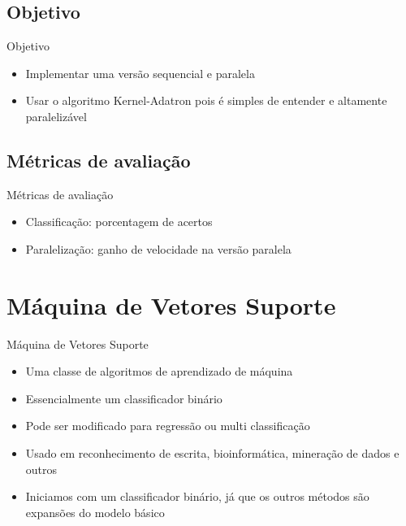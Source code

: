 \documentclass{beamer}
\begin{document}
\subsection{Objetivo}

\begin{frame}{Objetivo}
  \begin{itemize}
  \item {
    Implementar uma versão sequencial e paralela
  }
  \item {   
    Usar o algoritmo Kernel-Adatron pois é simples de entender e altamente paralelizável
  }
  \end{itemize}
\end{frame}

\subsection{Métricas de avaliação}

\begin{frame}{Métricas de avaliação}
  \begin{itemize}
  \item {
    Classificação: porcentagem de acertos
  }
  \item {   
    Paralelização: ganho de velocidade na versão paralela
  }
  \end{itemize}
\end{frame}

\section{Máquina de Vetores Suporte}

\begin{frame}{Máquina de Vetores Suporte}
  \begin{itemize}
  \item {
    Uma classe de algoritmos de aprendizado de máquina
  }
  \item {
    Essencialmente um classificador binário 
  }
  \item {
    Pode ser modificado para regressão ou multi classificação
  }
  \item {
    Usado em reconhecimento de escrita, bioinformática, mineração de dados e outros
  }
  \item {
    Iniciamos com um classificador binário, já que os outros métodos são expansões do modelo básico
  }
  \end{itemize}
\end{frame}
\end{document}

